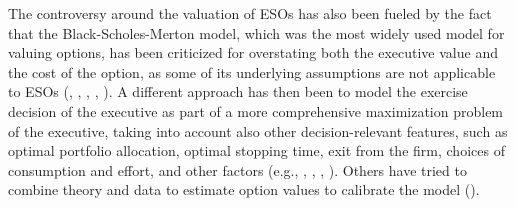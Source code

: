     The controversy around the valuation of ESOs has also been fueled by the fact that the Black-Scholes-Merton model, which was the most widely used model for valuing options, has been criticized for overstating both the executive value and the cost of the option, as some of its underlying assumptions are not applicable to ESOs (\cite{carpenter1998exercise}, \cite{meulbroek2001efficiency}, \cite{hall2003trouble}, \cite{ingersoll2006subjective}, \cite{carpenter2010optimal} \cite{frydman2010ceo}). A different approach has then been to model the exercise decision of the executive as part of a more comprehensive maximization problem of the executive, taking into account also other decision-relevant features, such as optimal portfolio allocation, optimal stopping time, exit from the firm, choices of consumption and effort, and other factors (e.g., \cite{huddart1996employee}, \cite{ingersoll2006subjective}, \cite{grasselli2009risk}, \cite{carpenter2010optimal}). Others have tried to combine theory and data to estimate option values to calibrate the model (\cite{carpenter1998exercise}).

